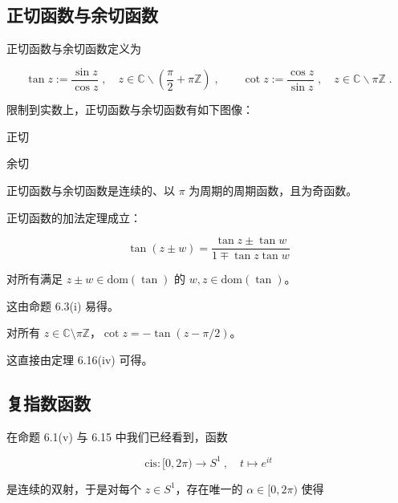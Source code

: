 \subsection*{正切函数与余切函数}

正切函数与余切函数定义为

\[
\tan z:=\frac{\sin z}{\cos z}\;,\quad z\in\mathbb{C}\backslash\left(\frac{\pi}{2}+\pi\mathbb{Z}\right)\;,\qquad\cot z:=\frac{\cos z}{\sin z}\;,\quad z\in\mathbb{C}\backslash\pi\mathbb{Z}\;.
\]

限制到实数上，正切函数与余切函数有如下图像：


正切


余切

\begin{remark}

\begin{items}
\item

正切函数与余切函数是连续的、以 $ \pi $ 为周期的周期函数，且为奇函数。

\item

正切函数的加法定理成立：

\[
\tan(z\pm w)=\frac{\tan z\pm\tan w}{1\mp\tan z\tan w}
\]

对所有满足 $ z \pm w \in \mathrm{dom}(\tan) $ 的 $ w, z \in \mathrm{dom}(\tan) $。

\proofhead
这由命题 6.3(i) 易得。
\item

对所有 $ z \in \mathbb{C} \setminus \pi \mathbb{Z} $，$ \cot z = -\tan(z - \pi/2) $。

\proofhead
这直接由定理 6.16(iv) 可得。
\end{items}

\end{remark}

\subsection*{复指数函数}

在命题 6.1(v) 与 6.15 中我们已经看到，函数

\[
\mathrm{c i s}\colon[0,2\pi)\to S^{1}~,\quad t\mapsto e^{i t}
\]

是连续的双射，于是对每个 $ z \in S^1 $，存在唯一的 $ \alpha \in [0, 2\pi) $ 使得

